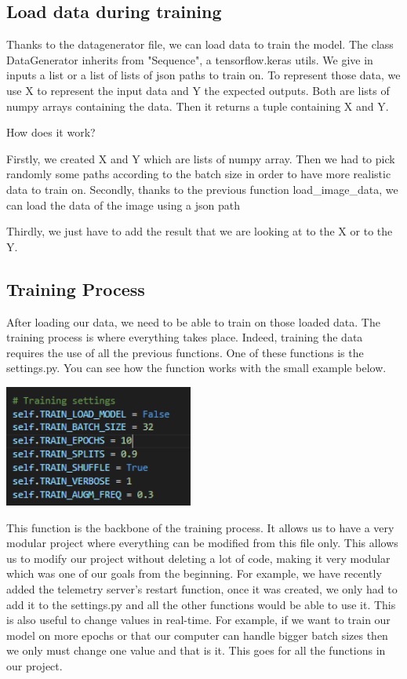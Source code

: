 \documentclass[12pt]{article}
\begin{document}
\subsection{Load data during training}
Thanks to the datagenerator file, we can load data to train the model. The class DataGenerator inherits from "Sequence", a tensorflow.keras utils. We give in inputs a list or a list of lists of json paths to train on. To represent those data, we use X to represent the input data and Y the expected outputs. Both are lists of numpy arrays containing the data. Then it returns a tuple containing X and Y.  

How does it work?  

Firstly, we created X and Y which are lists of numpy array. Then we had to pick randomly some paths according to the batch size in order to have more realistic data to train on. Secondly, thanks to the previous function load\_image\_data, we can load the data of the image using a json path

Thirdly, we just have to add the result that we are looking at to the X or to the Y.

\subsection{Training Process}

After loading our data, we need to be able to train on those loaded data. The training process is where everything takes place. Indeed, training the data requires the use of all the previous functions. One of these functions is the settings.py. You can see how the function works with the small example below.

\centerline{\includegraphics[height=4cm]{../../docs/setting-train.png}}

This function is the backbone of the training process. It allows us to have a very modular project where everything can be modified from this file only. This allows us to modify our project without deleting a lot of code, making it very modular which was one of our goals from the beginning. For example, we have recently added the telemetry server's restart function, once it was created, we only had to add it to the settings.py and all the other functions would be able to use it.   
This is also useful to change values in real-time. For example, if we want to train our model on more epochs or that our computer can handle bigger batch sizes then we only must change one value and that is it. This goes for all the functions in our project. 
\end{document}
